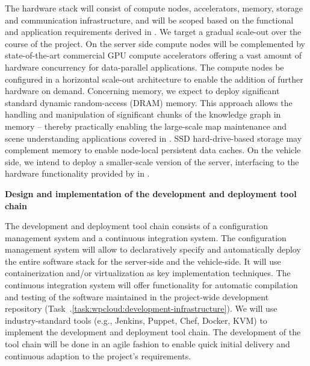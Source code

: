 {\begin{tasks}{\WPCloudNo}
The hardware stack will consist of compute nodes, accelerators, memory, storage
  and communication infrastructure, and will be scoped based on the functional
  and application requirements derived in \WPSpecification. We target a gradual scale-out over the course of the project.
On the server side
  compute nodes will be complemented by state-of-the-art commercial GPU
  compute accelerators offering a vast amount of hardware concurrency for
  data-parallel applications.
The compute nodes be configured in a horizontal scale-out architecture
  to enable the addition of further hardware on demand.
Concerning memory, we expect to deploy significant standard dynamic random-access (DRAM) memory.
This approach allows the handling and
  manipulation of significant chunks of the knowledge graph in memory -- thereby
  practically enabling the large-scale map maintenance and scene understanding
  applications covered in \Project.
SSD hard-drive-based storage may
  complement memory to enable node-local persistent data caches.
On the vehicle side,
  we intend to deploy a smaller-scale version of the server, interfacing to the
  hardware functionality provided by \VW in \WPVehicle.


\item {\bf Design and implementation of the development and deployment tool chain}
\label{task:wpcloud:2}

The development and deployment tool chain consists of
  a configuration management system and a continuous integration system.
The configuration management system will allow to declaratively specify and
  automatically deploy the entire software stack for the server-side and the
  vehicle-side.
It will use containerization and/or virtualization as key implementation techniques.
The continuous integration system will offer functionality for automatic
  compilation and testing of the software
  maintained in the project-wide development repository (Task~\WPCloudNo.\ref{task:wpcloud:development-infrastructure}).
We will use industry-standard tools (e.g., Jenkins, Puppet, Chef, Docker, KVM)
  to implement the development and deployment tool chain.
The development of the tool chain will be done in an agile fashion to enable
  quick initial delivery and continuous adaption to the project's
  requirements.



\end{tasks}}
